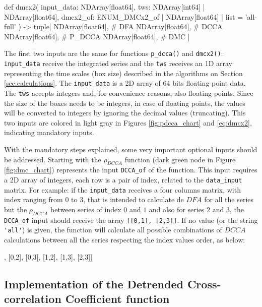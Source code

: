 \documentclass[nojss]{jss}
\begin{document}
\begin{Code}
def dmcx2(
    input_data: NDArray[float64],
    tws: NDArray[int64] | NDArray[float64],
    dmcx2_of: ENUM_DMCx2_of | NDArray[float64] | list = 'all-full'
) -> tuple[ NDArray[float64],   # DFA
            NDArray[float64],   # DCCA
            NDArray[float64],   # P_DCCA
            NDArray[float64],   # DMC
          ]
  \end{Code}

The first two inputs are the same for functions \verb"p_dcca()" and \verb"dmcx2()": \verb"input_data" receive the integrated series and the \verb"tws" receives an 1D array representing the time scales (box size) described in the algorithms on Section \ref{sec:calculations}. The \verb"input_data" is a 2D array of 64 bits floating point data. The \verb"tws" accepts integers and, for convenience reasons, also floating points. Since the size of the boxes needs to be integers, in case of floating points, the values will be converted to integers by ignoring the decimal values (truncating). This two inputs are colored in light gray in Figures \ref{fig:pdcca_chart} and \ref{eq:dmcx2}, indicating mandatory inputs.

With the mandatory steps explained, some very important optional inputs should be addressed. Starting with the $\rho_{DCCA}$ function (dark green node in Figure \ref{fig:dmc_chart}) represents the input \verb"DCCA_of" of the function. This input requires a 2D array of integers, each row is a pair of index, related to the \verb"data_input" matrix. For example: if the \verb"input_data" receives a four columns matrix, with index ranging from $0$ to $3$, that is intended to calculate de $DFA$ for all the series but the $\rho_{DCCA}$ between series of index $0$ and $1$ and also for series $2$ and $3$, the \verb"DCCA_of" input should receive the array \verb"[[0,1], [2,3]]". If no value (or the string \verb"'all'") is given, the function will calculate all possible combinations of $DCCA$ calculations between all the series respecting the index values order, as below:

\begin{Code}
[[0,1], [0,2], [0,3], [1,2], [1,3], [2,3]]
\end{Code}

\subsection{Implementation of the Detrended Cross-correlation Coefficient function}
\end{document}
